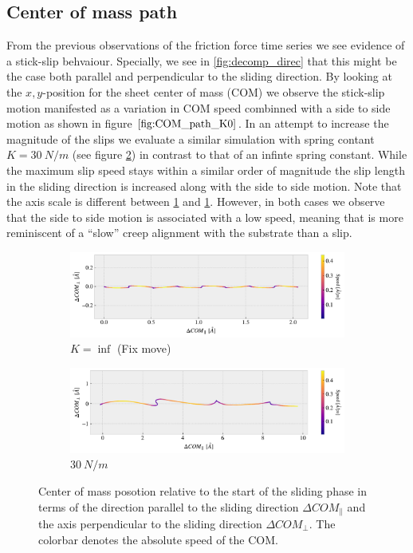 \subsection{Center of mass path}
From the previous observations of the friction force time series we see evidence
of a stick-slip behvaiour. Specially, we see in \cref{fig:decomp_direc}
that this might be the case both parallel and perpendicular to the sliding
direction. By looking at the $x,y$-position for the sheet center of mass (COM)
we observe the stick-slip motion manifested as a variation in COM speed combinned
with a side to side motion as shown in figure $\cref{fig:COM_path_K0}$. In an attempt to increase the magnitude of the slips we evaluate a similar simulation with spring contant $K = \SI{30}{N/m}$ (see figure
\cref{fig:COM_path_K30}) in contrast to that of an infinte spring constant. While
the maximum slip speed stays within a similar order of magnitude the slip length
in the sliding direction is increased along with the side to side motion. Note
that the axis scale is different between \cref{fig:COM_path_K0} and
\cref{fig:COM_path_K0}. However, in both cases we observe that the side to side
motion is associated with a low speed, meaning that is more reminiscent of a ``slow'' creep alignment with the substrate than a slip. 


\begin{figure}[H]
  \centering
  \begin{subfigure}[t]{0.85\textwidth}
    \centering
    \includegraphics[width=\textwidth]{figures/baseline/COM_path_K0.pdf}
    \caption{$K=\inf$ (Fix move)}
    \label{fig:COM_path_K0}
  \end{subfigure}
  \hfill
  \begin{subfigure}[t]{0.85\textwidth}
      \centering
      \includegraphics[width=\textwidth]{figures/baseline/COM_path_K30.pdf}
      \caption{$\SI{30}{N/m}$}
      \label{fig:COM_path_K30}
  \end{subfigure}
  \caption{Center of mass posotion relative to the start of the sliding phase in terms of the direction parallel to the sliding direction $\Delta COM_{\parallel}$ and the axis perpendicular to the sliding direction $\Delta COM_{\perp}$. The colorbar denotes the absolute speed of the COM.}
  \label{fig:COM_path}
\end{figure}


